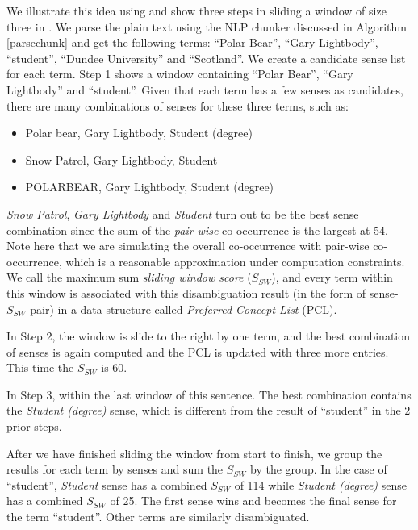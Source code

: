 We illustrate this idea using  and show three steps
in sliding a window of size three in .
We parse the plain text using the NLP chunker discussed in Algorithm \ref{parsechunk}
and get the following terms: ``Polar Bear'', ``Gary Lightbody'', ``student'',
``Dundee University'' and ``Scotland''.
We create a candidate sense list for each term. Step 1 shows a window
containing ``Polar Bear'', ``Gary Lightbody'' and ``student''. Given that
each term has a few senses as candidates,
there are many combinations of senses for these three terms, such as:
\begin{itemize}
\item Polar bear, Gary Lightbody, Student (degree)
\item Snow Patrol, Gary Lightbody, Student
\item POLARBEAR, Gary Lightbody, Student (degree)
\end{itemize}
{\em Snow Patrol}, {\em Gary Lightbody} and {\em Student} turn out to be
the best sense combination since the sum of the {\em pair-wise}
co-occurrence is the largest at 54. Note here that we are simulating
the overall co-occurrence with pair-wise co-occurrence, which is a reasonable
approximation under computation constraints. We call the maximum sum
{\em sliding window score} ($S_{SW}$), and every term within this window
is associated with this disambiguation result (in the form of sense-$S_{SW}$ pair)
in a data structure called {\em Preferred Concept List} (PCL).

In Step 2, the window is slide to the right by one term, and the best
combination of senses is again computed and the PCL is updated with three
more entries. This time the $S_{SW}$ is 60.

In Step 3, within the last window of this sentence. The best combination
contains the {\em Student (degree)} sense, which is different from the result
of ``student'' in the 2 prior steps.

After we have finished sliding the window from start to finish, we group
the results for each term by senses and sum the $S_{SW}$ by the group.
In the case of ``student'', {\em Student} sense has a combined $S_{SW}$ of
114 while {\em Student (degree)} sense has a combined $S_{SW}$ of 25. The
first sense wins and becomes the final sense for the term ``student''.
Other terms are similarly disambiguated.

